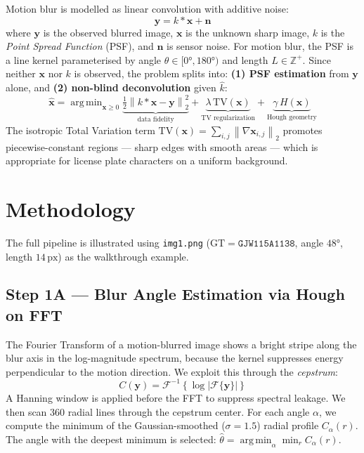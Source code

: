 \documentclass[12pt,a4paper]{article}
\DeclareMathOperator*{\argmin}{arg\,min}
\newcommand{\norm}[1]{\left\lVert#1\right\rVert}
\begin{document}
Motion blur is modelled as linear convolution with additive noise:
\begin{equation}
  \mathbf{y} = k \ast \mathbf{x} + \mathbf{n}
  \label{eq:degradation}
\end{equation}
where $\mathbf{y}$ is the observed blurred image, $\mathbf{x}$ is the unknown sharp image,
$k$ is the \emph{Point Spread Function} (PSF), and $\mathbf{n}$ is sensor noise.
For motion blur, the PSF is a line kernel parameterised by angle $\theta \in [0°, 180°)$
and length $L \in \mathbb{Z}^+$.
Since neither $\mathbf{x}$ nor $k$ is observed, the problem splits into:
\textbf{(1) PSF estimation} from $\mathbf{y}$ alone, and
\textbf{(2) non-blind deconvolution} given $\hat{k}$:
\begin{equation}
  \hat{\mathbf{x}} = \argmin_{\mathbf{x} \geq 0}
    \underbrace{\tfrac{1}{2}\norm{k \ast \mathbf{x} - \mathbf{y}}^2_2}_{\text{data fidelity}}
    + \underbrace{\lambda\,\mathrm{TV}(\mathbf{x})}_{\text{TV regularization}}
    + \underbrace{\gamma\,H(\mathbf{x})}_{\text{Hough geometry}}
  \label{eq:objective}
\end{equation}
The isotropic Total Variation term $\mathrm{TV}(\mathbf{x}) = \sum_{i,j}\norm{\nabla\mathbf{x}_{i,j}}_2$
promotes piecewise-constant regions --- sharp edges with smooth areas --- which is appropriate
for license plate characters on a uniform background.

\section{Methodology}

The full pipeline is illustrated using \texttt{img1.png}
($\mathrm{GT} = \mathtt{GJW115A1138}$, angle $48°$, length $14\,\mathrm{px}$)
as the walkthrough example.

\subsection{Step 1A --- Blur Angle Estimation via Hough on FFT}

The Fourier Transform of a motion-blurred image shows a bright stripe along the blur axis
in the log-magnitude spectrum, because the kernel suppresses energy perpendicular to the
motion direction. We exploit this through the \emph{cepstrum}:
\begin{equation}
  C(\mathbf{y}) = \mathcal{F}^{-1}\!\left\{\log\left|\mathcal{F}\{\mathbf{y}\}\right|\right\}
\end{equation}
A Hanning window is applied before the FFT to suppress spectral leakage.
We then scan 360 radial lines through the cepstrum center. For each angle $\alpha$,
we compute the minimum of the Gaussian-smoothed ($\sigma{=}1.5$) radial profile $C_\alpha(r)$.
The angle with the deepest minimum is selected:
$\hat{\theta} = \argmin_{\alpha} \min_{r} C_\alpha(r)$.
\end{document}
